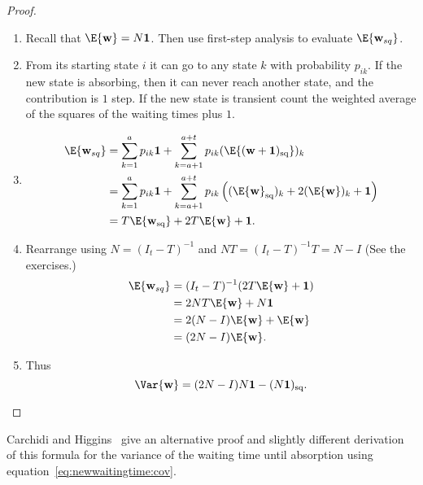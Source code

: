 \documentclass[12pt]{article}
\begin{document}
\begin{proof}
  \begin{enumerate}
  \item 
  Recall that \( \E{\mathbf{w}} = N \mathbf{1} \).
  Then use first-step analysis to evaluate \( \E{\mathbf{w}_{sq}} \).
\item 
  From its starting state \( i \) it can go to any state \( k \) with
  probability $p_{ik}$.  If the new state is absorbing, then it can
  never reach another state, and the contribution is \( 1 \) step.  If
  the new state is transient count the weighted average of the squares
  of the waiting times plus \(1 \).
\item 
\begin{align*}
     \E{\mathbf{w}_{sq}} &=
     \sum\limits_{k=1}^{a} p_{ik} \mathbf{1} +
                         \sum\limits_{k=a+1}^{a+t} p_{ik}
                         (\E{(\mathbf{w}+\mathbf{1})_{\text{sq}} })_k \\
                         &= \sum\limits_{k=1}^{a} p_{ik} \mathbf{1} +
                           \sum\limits_{k=a+1}^{a+t} p_{ik}
                           \left( (\E{ \mathbf{w}}_{\text{sq}})_k + 2
       (\E{ \mathbf{w}})_k + \mathbf{1} \right) \\
     &= T \E{\mathbf{w}_{\text{sq}}} + 2 T\E{\mathbf{w}} + \mathbf{1}.
\end{align*}
\item 
   Rearrange using \( N = (I_t - T)^{-1} \) and \( NT =
   (I_t - T)^{-1} T = N - I \) (See the exercises.) 
\begin{align*}
     \E{\mathbf{w}_{sq}} &= (I_t - T)^{-1} (2 T\E{\mathbf{w}} +
                           \mathbf{1}) \\
                        &= 2NT \E{\mathbf{w}} + N \mathbf{1} \\
                        &= 2(N-I) \E{\mathbf{w}} + \E{\mathbf{w}} \\
                        &= (2N-I) \E{\mathbf{w}}.
\end{align*}
\item 
Thus
\[
  \Var{\mathbf{w}} = (2N - I)N\mathbf{1} -
     (N\mathbf{1})_{\text{sq}}.
\]
  \end{enumerate}
\end{proof}

\begin{remark}
  Carchidi and Higgins~\cite{carchidi17} give an alternative proof and slightly
  different derivation of this formula for the variance of the waiting
  time until absorption using equation~\eqref{eq:newwaitingtime:cov}.
\end{remark}
\end{document}
